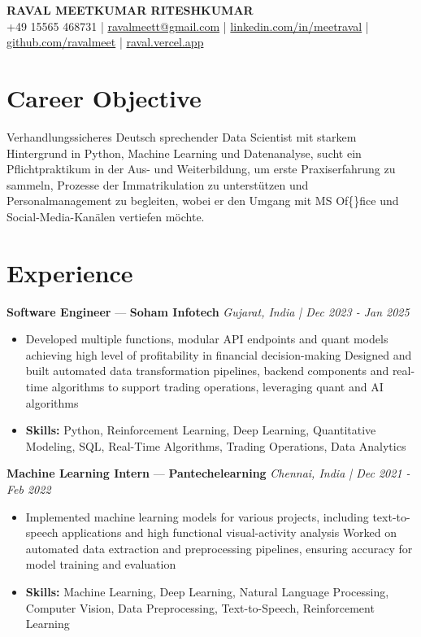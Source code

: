 \documentclass[a4paper,10pt]{article}
\begin{document}
\begin{center}
  {\Large\bfseries RAVAL MEETKUMAR RITESHKUMAR}\\[2pt]
  {\small +49 15565 468731 \;|\; \href{mailto:ravalmeett@gmail.com}{ravalmeett@gmail.com} \;|\; \href{https://www.linkedin.com/in/meetraval/}{linkedin.com/in/meetraval} \;|\; \href{https://github.com/ravalmeet}{github.com/ravalmeet} \;|\; \href{https://raval.vercel.app/}{raval.vercel.app}}
\end{center}
\vspace{-3pt}

\section*{Career Objective}
Verhandlungssicheres Deutsch sprechender Data Scientist mit starkem Hintergrund in Python, Machine Learning und Datenanalyse, sucht ein Pflichtpraktikum in der Aus- und Weiterbildung, um erste Praxiserfahrung zu sammeln, Prozesse der Immatrikulation zu unterstützen und Personalmanagement zu begleiten, wobei er den Umgang mit MS Of\{\}fice und Social-Media-Kanälen vertiefen möchte.\par

\section*{Experience}
\textbf{Software Engineer} — \textbf{Soham Infotech} \hfill \textit{Gujarat, India \;|\; Dec 2023 - Jan 2025}\par
\vspace{1pt}
\begin{itemize}
  \item Developed multiple functions, modular API endpoints and quant models achieving high level of profitability in financial decision-making Designed and built automated data transformation pipelines, backend components and real-time algorithms to support trading operations, leveraging quant and AI algorithms
  \item \textbf{Skills:} Python, Reinforcement Learning, Deep Learning, Quantitative Modeling, SQL, Real-Time Algorithms, Trading Operations, Data Analytics
\end{itemize}
\vspace{3pt}
\textbf{Machine Learning Intern} — \textbf{Pantechelearning} \hfill \textit{Chennai, India \;|\; Dec 2021 - Feb 2022}\par
\vspace{1pt}
\begin{itemize}
  \item Implemented machine learning models for various projects, including text-to-speech applications and high functional visual-activity analysis Worked on automated data extraction and preprocessing pipelines, ensuring accuracy for model training and evaluation
  \item \textbf{Skills:} Machine Learning, Deep Learning, Natural Language Processing, Computer Vision, Data Preprocessing, Text-to-Speech, Reinforcement Learning
\end{itemize}
\end{document}
